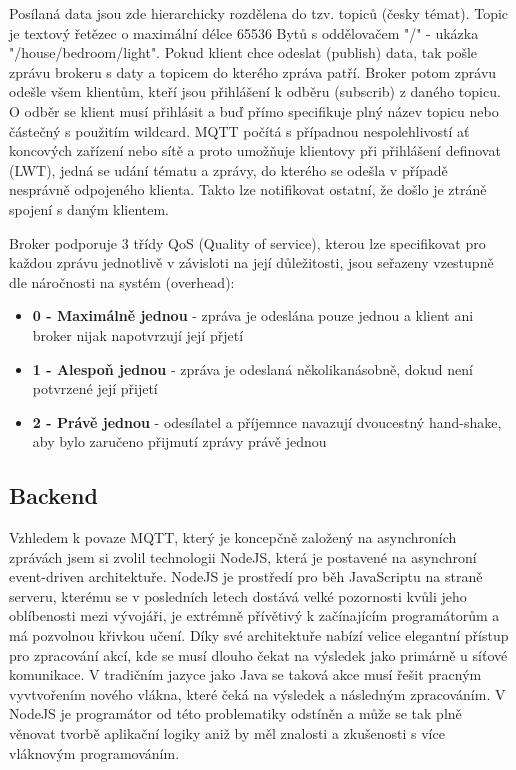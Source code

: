 \documentclass[thesis=B,czech]{FITthesis}[2019/12/23]
\begin{document}
Posílaná data jsou zde hierarchicky rozdělena do tzv. topiců (česky témat). Topic je textový řetězec o maximální délce 65536 Bytů s oddělovačem "/" - ukázka "/house/bedroom/light". Pokud klient chce odeslat (publish) data, tak pošle zprávu brokeru s daty a topicem do kterého zpráva patří. Broker potom zprávu odešle všem klientům, kteří jsou přihlášení k odběru (subscrib) z daného topicu. O odběr se klient musí přihlásit a buď přímo specifikuje plný název topicu nebo částečný s použitím wildcard. MQTT počítá s případnou nespolehlivostí ať koncových zařízení nebo sítě a proto umožňuje klientovy při přihlášení definovat  (LWT), jedná se udání tématu a zprávy, do kterého se odešla v případě nesprávně odpojeného klienta. Takto lze notifikovat ostatní, že došlo je ztráně spojení s daným klientem.

Broker podporuje 3 třídy QoS (Quality of service), kterou lze specifikovat pro každou zprávu jednotlivě v závisloti na její důležitosti, jsou seřazeny vzestupně dle náročnosti na systém (overhead):
\begin{itemize}
    \item \textbf{0 - Maximálně jednou} - zpráva je odeslána pouze jednou a klient ani broker nijak napotvrzují její přjetí
    \item \textbf{1 - Alespoň jednou} - zpráva je odeslaná několikanásobně, dokud není potvrzené její přijetí
    \item \textbf{2 - Právě jednou} - odesílatel a příjemnce navazují dvoucestný hand-shake, aby bylo zaručeno přijmutí zprávy právě jednou
\end{itemize}


\subsection{Backend}    %
Vzhledem k povaze MQTT, který je koncepčně založený na asynchroních zprávách jsem si zvolil technologii NodeJS, která je postavené na asynchroní event-driven architektuře. NodeJS je prostředí pro běh JavaScriptu na straně serveru, kterému se v posledních letech dostává velké pozornosti kvůli jeho oblíbenosti mezi vývojáři, je extrémně přívětivý k začínajícím programátorům a má pozvolnou křivkou učení. Díky své architektuře nabízí velice elegantní přístup pro zpracování akcí, kde se musí dlouho čekat na výsledek jako primárně u síťové komunikace. V tradičním jazyce jako Java se taková akce musí řešit pracným vyvtvořením nového vlákna, které čeká na výsledek a následným zpracováním. V NodeJS je programátor od této problematiky odstíněn a může se tak plně věnovat tvorbě aplikační logiky aniž by měl znalosti a zkušenosti s více vláknovým programováním.
\end{document}
